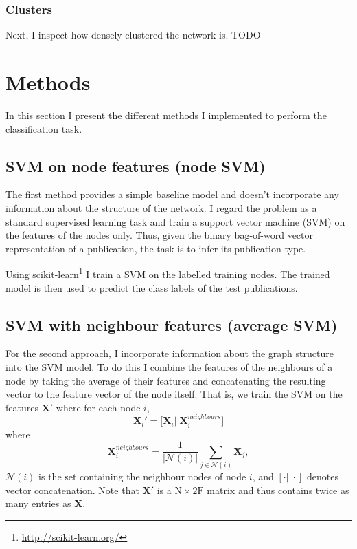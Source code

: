 \documentclass[12pt]{article}
\theoremstyle{definition}
\begin{document}
\subsubsection{Clusters}
Next, I inspect how densely clustered the network is. TODO

\section{Methods}
In this section I present the different methods I implemented to perform the classification task.

\subsection{SVM on node features (node SVM)}
The first method provides a simple baseline model and doesn't incorporate any information about the structure of the network. I regard the problem as a standard supervised learning task and train a support vector machine (SVM) on the features of the nodes only. Thus, given the binary bag-of-word vector representation of a publication, the task is to infer its publication type. 

\bigskip

Using scikit-learn\footnote{\url{http://scikit-learn.org/}} \cite{scikit-learn} I train a SVM on the labelled training nodes. The trained model is then used to predict the class labels of the test publications.

\subsection{SVM with neighbour features (average SVM)}
\label{section/average_svm}
For the second approach, I incorporate information about the graph structure into the SVM model. To do this I combine the features of the neighbours of a node by taking the average of their features and concatenating the resulting  vector to the feature vector of the node itself. That is, we train the SVM on the features $\mathbf{X}'$ where for each node $i$,
\[
	\mathbf{X}_i' = \big[\mathbf{X}_i \big\vert \big\vert \mathbf{X}^{\mathit{neighbours}}_i \big]
\]
where
\[
	\mathbf{X}^{\mathit{neighbours}}_i  = \frac{1}{\left\vert \mathcal{N}(i) \right\vert} \sum_{j \in \mathcal{N}(i)} \mathbf{X}_j,
\]
$\mathcal{N}(i)$ is the set containing the neighbour nodes of node $i$, and $[\cdot \vert\vert \cdot ]$ denotes vector concatenation. Note that $\mathbf{X}'$ is a $\textrm{N} \times 2 \textrm{F}$ matrix and thus contains twice as many entries as $\mathbf{X}$.
\end{document}
